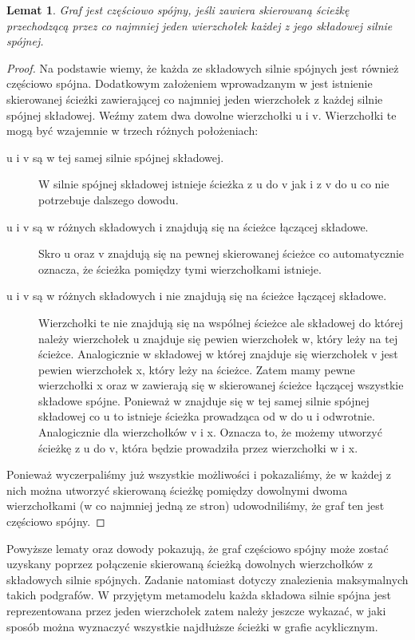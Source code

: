 \documentclass[a4paper,10pt]{article}
\newtheorem{lem}[twr]{Lemat}
\begin{document}
\begin{lem}
\label{sciezka}
  Graf jest częściowo spójny, jeśli zawiera skierowaną ścieżkę
  przechodzącą przez co najmniej jeden wierzchołek każdej z jego
  składowej silnie spójnej.
\end{lem}

\begin{proof}
  Na podstawie \label{silnie czesciowo} wiemy, że każda ze składowych
  silnie spójnych jest również częściowo spójna. Dodatkowym założeniem
  wprowadzanym w \label{sciezka} jest istnienie skierowanej ścieżki
  zawierającej co najmniej jeden wierzchołek z każdej silnie spójnej
  składowej. Weźmy zatem dwa dowolne wierzchołki u i v. Wierzchołki te
  mogą być wzajemnie w trzech różnych położeniach:
  \begin{description}
  \item[u i v są w tej samej silnie spójnej składowej.] W silnie
    spójnej składowej istnieje ścieżka z u do v jak i z v do u co nie
    potrzebuje dalszego dowodu.
  \item[u i v są w różnych składowych i znajdują się na ścieżce
    łączącej składowe.] Skro u oraz v znajdują się na pewnej
    skierowanej ścieżce co automatycznie oznacza, że ścieżka pomiędzy
    tymi wierzchołkami istnieje.
  \item[u i v są w różnych składowych i nie znajdują się na ścieżce
    łączącej składowe.] Wierzchołki te nie znajdują się na wspólnej
    ścieżce ale składowej do której należy wierzchołek u znajduje się
    pewien wierzchołek w, który leży na tej ścieżce. Analogicznie w
    składowej w której znajduje się wierzchołek v jest pewien
    wierzchołek x, który leży na ścieżce. Zatem mamy pewne wierzchołki
    x oraz w zawierają się w skierowanej ścieżce łączącej wszystkie
    składowe spójne. Ponieważ w znajduje się w tej samej silnie
    spójnej składowej co u to istnieje ścieżka prowadząca od w do u i
    odwrotnie. Analogicznie dla wierzchołków v i x. Oznacza to, że
    możemy utworzyć ścieżkę z u do v, która będzie prowadziła przez
    wierzchołki w i x.
  \end{description}
  Ponieważ wyczerpaliśmy już wszystkie możliwości i pokazaliśmy, że w
  każdej z nich można utworzyć skierowaną ścieżkę pomiędzy dowolnymi
  dwoma wierzchołkami (w co najmniej jedną ze stron) udowodniliśmy, że
  graf ten jest częściowo spójny.
\end{proof}

Powyższe lematy oraz dowody pokazują, że graf częściowo spójny może
zostać uzyskany poprzez połączenie skierowaną ścieżką dowolnych
wierzchołków z składowych silnie spójnych. Zadanie natomiast dotyczy
znalezienia maksymalnych takich podgrafów. W przyjętym metamodelu
każda składowa silnie spójna jest reprezentowana przez jeden
wierzchołek zatem należy jeszcze wykazać, w jaki sposób można
wyznaczyć wszystkie najdłuższe ścieżki w grafie acyklicznym.
\end{document}

